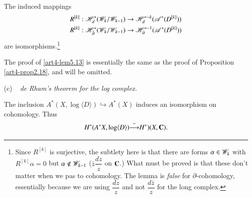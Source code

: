 \begin{lemma}\label{art4-lem5.13}
The induced mappings 
\begin{align*}
& R^{[k]}: \mathscr{H}^\ast_d (\mathscr{W}_k / \mathscr{W}_{k-1}) \to \mathscr{H}^{\ast-k}_d (\mathscr{A}^\ast (D^{[k]}))\\
& R^{[k]} : \mathscr{H}^\ast_{\bar{\partial}} (\mathscr{W}_k / \mathscr{W}_{k-1}) \to \mathscr{H}^{\ast-1}_{\partial} (\mathscr{A}^\ast (D^{[k]}))
\end{align*}
are isomorphisms.\footnote[22]{Since $R^{[k]}$ is surjective, the subtlety here is that there are forms $\alpha \in \mathscr{W}_k$ with $R^{[k]}\alpha =0$ but $\alpha \not\in \mathscr{W}_{k-1}$ (\eg $\bar{z} \dfrac{dz}{z}$ on $\mathbf{C}$.) What must be proved is that these don't matter when we pas to cohomology. The lemma is \textit{false} for $\partial$-cohomology, essentially because we are using $\dfrac{dz}{z}$ and not $\dfrac{d\bar{z}}{z}$ for the long complex.}
\end{lemma}

The proof of \eqref{art4-lem5.13} is essentially the same as the proof of Proposition  \eqref{art4-prop2.18}, and will be omitted.

(c) ~ \textit{de Rham's theorem for the log complex.}

\setcounter{proposition}{13}
\begin{proposition}\label{art4-prop5.14}
The inclusion $A^\ast (X, \log \langle D \rangle) \hookrightarrow A^\ast (X)$ induces an isomorphism on cohomology. Thus
$$
H^\ast (A^\ast X, \log \langle D \rangle) {\displaystyle{\mathop{\longrightarrow}^{\sim}}} H^\ast )(X, \mathbf{C}).
$$
\end{proposition}

